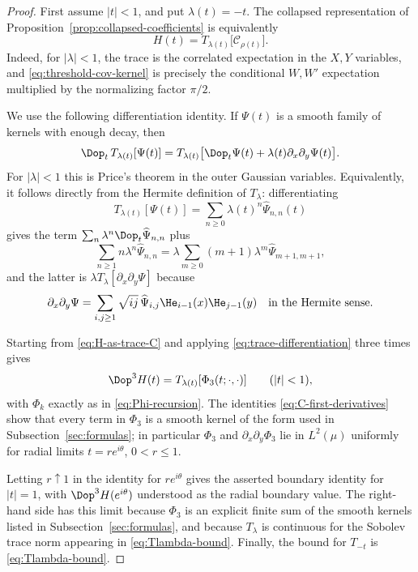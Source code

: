 \begin{proof}
First assume $|t|<1$, and put $\lambda(t)=-t$.  The collapsed representation of Proposition~\ref{prop:collapsed-coefficients} is equivalently
\begin{equation}\label{eq:H-as-trace-C}
  H(t)=T_{\lambda(t)}\bigl[\mathcal C_{\rho(t)}\bigr].
\end{equation}
Indeed, for $|\lambda|<1$, the trace is the correlated expectation in the $X,Y$ variables, and \eqref{eq:threshold-cov-kernel} is precisely the conditional $W,W'$ expectation multiplied by the normalizing factor $\pi/2$.

We use the following differentiation identity.  If $\Psi(t)$ is a smooth family of kernels with enough decay, then
\begin{equation}\label{eq:trace-differentiation}
  \Dop_t\,T_{\lambda(t)}[\Psi(t)]
  =T_{\lambda(t)}\bigl[\Dop_t\Psi(t)+\lambda(t)\partial_x\partial_y\Psi(t)\bigr].
\end{equation}
For $|\lambda|<1$ this is Price's theorem in the outer Gaussian variables.  Equivalently, it follows directly from the Hermite definition of $T_\lambda$: differentiating
\[
  T_{\lambda(t)}[\Psi(t)]
  =\sum_{n\ge0}\lambda(t)^n\widehat\Psi_{n,n}(t)
\]
gives the term $\sum_n\lambda^n\Dop_t\widehat\Psi_{n,n}$ plus
\[
  \sum_{n\ge1} n\lambda^n\widehat\Psi_{n,n}
  =\lambda\sum_{m\ge0}(m+1)\lambda^m\widehat\Psi_{m+1,m+1},
\]
and the latter is $\lambda T_\lambda[\partial_x\partial_y\Psi]$ because
\[
  \partial_x\partial_y\Psi
  =\sum_{i,j\ge1}\sqrt{ij}\,\widehat\Psi_{i,j}\He_{i-1}(x)\He_{j-1}(y)
  \quad\text{in the Hermite sense.}
\]

Starting from \eqref{eq:H-as-trace-C} and applying \eqref{eq:trace-differentiation} three times gives
\[
  \Dop^3H(t)=T_{\lambda(t)}[\Phi_3(t;\cdot,\cdot)]
  \qquad(|t|<1),
\]
with $\Phi_k$ exactly as in \eqref{eq:Phi-recursion}.  The identities \eqref{eq:C-first-derivatives} show that every term in $\Phi_3$ is a smooth kernel of the form used in Subsection~\ref{sec:formulas}; in particular $\Phi_3$ and $\partial_x\partial_y\Phi_3$ lie in $L^2(\mu)$ uniformly for radial limits $t=re^{i\theta}$, $0<r\le1$.

Letting $r\uparrow1$ in the identity for $re^{i\theta}$ gives the asserted boundary identity for $|t|=1$, with $\Dop^3H(e^{i\theta})$ understood as the radial boundary value.  The right-hand side has this limit because $\Phi_3$ is an explicit finite sum of the smooth kernels listed in Subsection~\ref{sec:formulas}, and because $T_\lambda$ is continuous for the Sobolev trace norm appearing in \eqref{eq:Tlambda-bound}.  Finally, the bound for $T_{-t}$ is \eqref{eq:Tlambda-bound}.
\end{proof}

